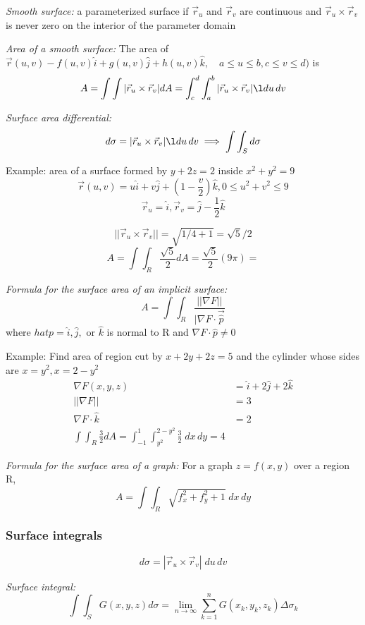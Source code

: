 \documentclass[12pt]{article}
\begin{document}
\emph{Smooth surface:} a parameterized surface if $\vec{r}_u$ and $\vec{r}_v$ are continuous and $\vec{r}_u \times \vec{r}_v$ is never zero on the interior of the parameter domain

\emph{Area of a smooth surface:}
The area of $\vec{r}(u, v) - f(u,v) \hat{i} + g(u, v) \hat{j} + h(u, v) \hat{k}, \quad a\leq u \leq b, c\leq v\leq d)$ is 
\[A =\int \int |\vec{r}_u \times \vec{r}_v| dA = \int_c^d \int_a^b |\vec{r}_u \times \vec{r}_v|\l du\, dv\]

\emph{Surface area differential:}
\[d\sigma =  |\vec{r}_u \times \vec{r}_v|\l du\, dv \implies \int \int_S d\sigma\]

Example: area of a surface formed by $y + 2z = 2$ inside $x^2 + y^2 = 9$
\[\vec{r}(u, v) = u \hat{i} + v\hat{j} + (1 - \frac{v}{2})\hat{k}, 0 \leq u^2 + v^2 \leq 9\]
\[\vec{r}_u = \hat{i}, \vec{r}_v = \hat{j} - \frac{1}{2}\hat{k}\]

\[||\vec{r}_u \times \vec{r}_v|| = \sqrt{1/4 + 1} = \sqrt{5}/2\]
\[A= \int \int_R \frac{\sqrt{5}}{2} dA = \frac{\sqrt{5}}{2} (9 \pi) = \]

\emph{Formula for the surface area of an implicit surface:}
\[A = \int \int_R \frac{||\nabla F||}{|\nabla F \cdot \vec{\hat{p}}}\]
where $hat{p} = \hat{i}, \hat{j}, \text{ or } \hat{k}$ is normal to R and $\nabla F \cdot \hat{p} \neq 0$

Example: Find area of region cut by $x + 2y + 2z = 5$ and the cylinder whose sides are $x = y^2, x = 2-y^2$
\begin{align*}
    \nabla F(x,y,z) &= \hat{i} + 2\hat{j} + 2\hat{k}\\
    ||\nabla F|| &= 3\\
    \nabla F \cdot \hat{k} &= 2\\
    \int \int_R \frac{3}{2} dA = \int_{-1}^1 \int_{y^2}^{2-y^2} \frac{3}{2} \; dx\, dy = 4
\end{align*}

\emph{Formula for the surface area of a graph:} For a graph $z= f(x,y)$ over a region R, 
\[A = \int \int_R \sqrt{f_x^2 + f_y^2 + 1} \; dx\, dy\]

\subsubsection{Surface integrals}
\[d\sigma = |\vec{r}_u \times \vec{r}_v| \; du\, dv\]

\emph{Surface integral:}
\[\int \int_S G(x,y,z) d\sigma = \lim_{n\to \infty} \sum_{k=1}^n G(x_k, y_k, z_k) \Delta \sigma_k\]
\end{document}
